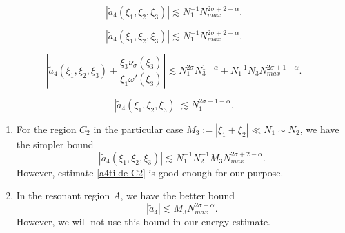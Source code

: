 \documentclass[10pt,a4paper]{amsart}
\begin{document}
      \begin{equation}\label{a4tilde-B1}
      |\widetilde{a}_4(\xi_1,\xi_2,\xi_3)| \lesssim N_1^{-1} N_{max}^{2\sigma+2-\alpha} .
    \end{equation}

       \begin{equation}\label{a4tilde-C2}
      |\widetilde{a}_4(\xi_1,\xi_2,\xi_3)| \lesssim N_1^{-1} N_{max}^{2\sigma+2-\alpha} .
    \end{equation}

   \begin{equation}\label{a4tilde-C3}
      \left|\widetilde{a}_4(\xi_1,\xi_2,\xi_3) + \frac{\xi_3\nu_\sigma(\xi_3)}{\xi_1\omega'(\xi_3)} \right| \lesssim N_1^{2\sigma}N_3^{1-\alpha} + N_1^{-1}N_3N_{max}^{2\sigma+1-\alpha} .
    \end{equation}

       \begin{equation}\label{a4tilde-C4}
      |\widetilde{a}_4(\xi_1,\xi_2,\xi_3)| \lesssim N_1^{2\sigma+1-\alpha} .
    \end{equation}

\begin{remark}
\begin{enumerate}
\item[$(i)$]
 For the region $C_2$ in the particular case $M_3:=|\xi_1+\xi_2|\ll N_1\sim N_2$,  we have the simpler bound
 $$
 |\widetilde{a}_4(\xi_1,\xi_2,\xi_3)| \lesssim N_1^{-1}N_2^{-1}M_3 N_{max}^{2\sigma+2-\alpha}.
 $$
 However, estimate \eqref{a4tilde-C2} is good enough for our purpose.
\item[$(ii)$]
In the resonant region $A$, we have the better bound 
\begin{equation} \label{bound:a4tilde-resonant}
|\widetilde{a}_{4}| \lesssim M_3N_{max}^{2\sigma-\alpha} .
\end{equation}
However, we will not use this bound in our energy estimate.
\end{enumerate}
\end{remark}
\end{document}

